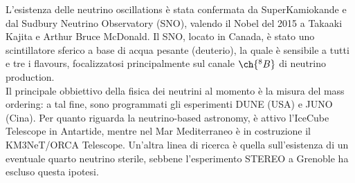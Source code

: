 L'esistenza delle neutrino oscillations è stata confermata da SuperKamiokande e dal Sudbury Neutrino Observatory (SNO), valendo il Nobel del 2015 a Takaaki Kajita e Arthur Bruce McDonald. Il SNO, locato in Canada, è stato uno scintillatore sferico a base di acqua pesante (deuterio), la quale è sensibile a tutti e tre i flavours, focalizzatosi principalmente sul canale $ \ch{^8B} $ di neutrino production.\\
Il principale obbiettivo della fisica dei neutrini al momento è la misura del mass ordering: a tal fine, sono programmati gli esperimenti DUNE (USA) e JUNO (Cina). Per quanto riguarda la neutrino-based astronomy, è attivo l'IceCube Telescope in Antartide, mentre nel Mar Mediterraneo è in costruzione il KM3NeT/ORCA Telescope. Un'altra linea di ricerca è quella sull'esistenza di un eventuale quarto neutrino sterile, sebbene l'esperimento STEREO a Grenoble ha escluso questa ipotesi.










